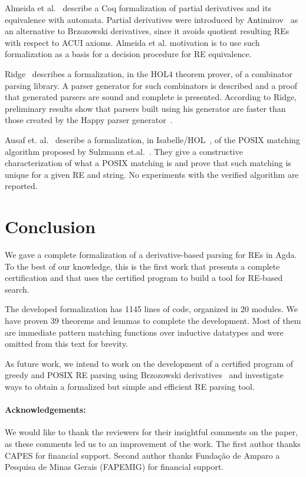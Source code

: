 \documentclass[fleqn,10pt]{SelfArx} %
\theoremstyle{definition}
\begin{document}
Almeida et al.~\cite{AlmeidaMPS10} describe a Coq formalization of
partial derivatives and its equivalence with automata. Partial
derivatives were introduced by Antimirov~\cite{Antimirov91} as an
alternative to Brzozowski derivatives, since it avoids quotient
resulting REs with respect to ACUI axioms. Almeida et al. motivation
is to use such formalization as a basis for a decision procedure for
RE equivalence.

Ridge~\cite{Ridge2011} describes a formalization, in the HOL4 theorem
prover, of a combinator parsing library. A parser generator for such
combinators is described and a proof that generated parsers are sound
and complete is presented.  According to Ridge, preliminary results
show that parsers built using his generator are faster than those
created by the Happy parser generator~\cite{Happy}.

Ausaf et. al.~\cite{AusafDU16} describe a formalization, in
Isabelle/HOL~\cite{Nipkow02}, of the POSIX matching algorithm proposed
by Sulzmann et.al.~\cite{SulzmannL14}. They give a constructive
characterization of what a POSIX matching is and prove that such
matching is unique for a given RE and string. No experiments with the
verified algorithm are reported.


\section{Conclusion}\label{sec:conclusion}

We gave a complete formalization of a derivative-based parsing
for REs in Agda. To the best of our knowledge, this is the first work
that presents a complete certification and that uses the certified
program to build a tool for RE-based search.

The developed formalization has 1145 lines of code, organized in 20
modules. We have proven 39 theorems and lemmas to complete the
development. Most of them are immediate pattern matching functions
over inductive datatypes and were omitted from this text for brevity.

As future work, we intend to work on the development of a certified
program of greedy and POSIX RE parsing using Brzozowski
derivatives~\cite{SulzmannL14,FrischC04} and investigate ways to
obtain a formalized but simple and efficient RE parsing tool.

\paragraph{Acknowledgements:} We would like to thank the reviewers 
for their insightful comments on the paper, as these comments led us 
to an improvement of the work. The first author thanks CAPES for financial
support. Second author thanks Fundação de Amparo a
Pesquisa de Minas Gerais (FAPEMIG) for financial support.



\end{document}
